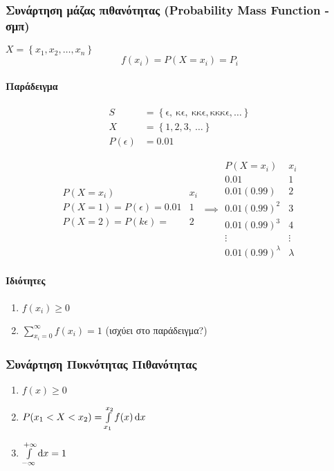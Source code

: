 \documentclass[11pt,a4paper,titlepage,draft]{article}
\begin{document}
\subsubsection{Συνάρτηση μάζας πιθανότητας (\textlatin{Probability Mass Function} - σμπ)}
\(
X =  \left\lbrace x_1,x_2,\dots,x_n \right\rbrace
\)
\[
f(x_i) = P(X=x_i) = P_i
\]

\paragraph{Παράδειγμα}
\begin{align*}
S &=  \left\lbrace \mathrm{\epsilon,\ \kappa \epsilon,\ \kappa \kappa \epsilon,\kappa \kappa \kappa \epsilon},\dots  \right\rbrace \\
X &=  \left\lbrace 1, 2, 3,\ \dots  \right\rbrace\\
P(\epsilon) &= 0.01
\end{align*}

\[
\begin{array}{r|l}
P(X=x_i) & x_i\\
\hline
P(X=1)=P(\epsilon)=0.01 & 1 \\
P(X=2)=P(k\epsilon)=\quad & 2 \\
\end{array}
\implies
\begin{array}{r|l}
P(X=x_i) & x_i\\
\hline
0.01 & 1\\
0.01(0.99) & 2 \\
0.01(0.99)^2 & 3 \\
0.01(0.99)^3 & 4 \\
\vdots & \vdots \\
0.01(0.99)^\lambda & \lambda
\end{array}
\]

\paragraph{Ιδιότητες}
\begin{enumerate}
\item \(f(x_i) \geq 0\)
\item \(\sum\limits_{x_i=0}^\infty f(x_i) = 1\) (ισχύει στο παράδειγμα?)
\end{enumerate}

\subsubsection{Συνάρτηση Πυκνότητας Πιθανότητας}
\begin{enumerate}
\item \(f(x) \geq 0\)
\item \(P(x_1 < X < x_2) = \int\limits_{x_1}^{x_2} f(x) \dif x\)
\item \(\int\limits_{-\infty}^{+\infty} \dif x = 1\)
\end{enumerate}
\end{document}
